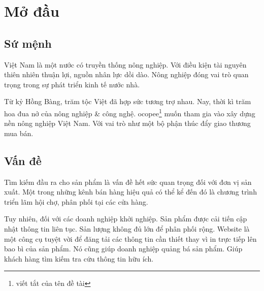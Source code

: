 \documentclass[11pt]{report}
\newcommand{\advisor}{TS. Lê Thị Mỹ Hạnh}
\begin{document}
\clearpage
\justifying

\pagestyle{fancy}
\fancyhf{}
\fancyhead[CE,CO]{\emph{{\normalsize {\@title}}}}


\fancyfoot[CE,CO]{{\normalsize {Hướng dẫn: \advisor}}	
}
\fancyfoot[LE,RO]{\thepage}

\renewcommand{\headrulewidth}{0.3pt}
\renewcommand{\footrulewidth}{0.3pt}




\setcounter{page}{1}
%
\section*{Mở đầu}

%
\subsection*{Sứ mệnh}
Việt Nam là một nước có truyền thống nông nghiệp. Với điều kiện tài nguyên thiên nhiên thuận lợi, nguồn nhân lực dồi dào. Nông nghiệp đóng vai trò quan trọng trong sự phát triển kinh tế nước nhà.

Từ kỷ Hồng Bàng, trăm tộc Việt đã hợp sức tương trợ nhau. Nay, thời kì trăm hoa đua nở của nông nghiệp \& công nghệ. \gls{ocopee}\footnote{viết tắt của tên đề tài}  muốn tham gia vào xây dựng nền nông nghiệp Việt Nam. Với vai trò như một bộ phận thúc đẩy giao thương mua bán.

%
\subsection*{Vấn đề}
Tìm kiếm đầu ra cho sản phẩm là vấn đề hết sức quan trọng đối với đơn vị sản xuất. Một trong những kênh bán hàng hiệu quả có thể kể đến đó là chương trình triển lãm hội chợ, phân phối tại các cửa hàng.

Tuy nhiên, đối với các doanh nghiệp khởi nghiệp. Sản phẩm được cải tiến cập nhật thông tin liên tục. Sản lượng không đủ lớn để phân phối rộng. Website là một công cụ tuyệt vời để đăng tải các thông tin cần thiết thay vì in trực tiếp lên bao bì của sản phẩm. Nó cũng giúp doanh nghiệp quảng bá sản phẩm. Giúp khách hàng tìm kiếm tra cứu thông tin hữu ích.
\end{document}
